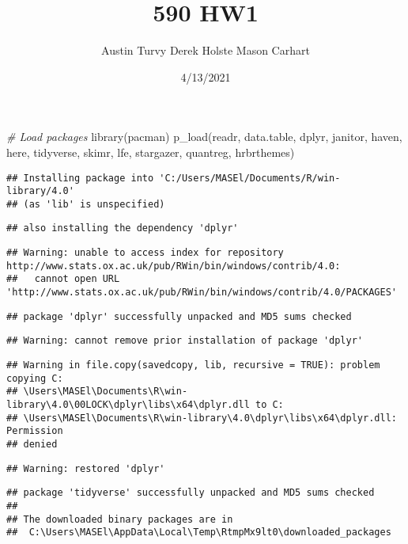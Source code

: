 \documentclass[
]{article}
\title{590 HW1}
\author{Austin Turvy Derek Holste Mason Carhart}
\date{4/13/2021}
\newenvironment{Shaded}{\begin{snugshade}}{\end{snugshade}}
\newcommand{\CommentTok}[1]{\textcolor[rgb]{0.56,0.35,0.01}{\textit{#1}}}
\newcommand{\FunctionTok}[1]{\textcolor[rgb]{0.00,0.00,0.00}{#1}}
\newcommand{\NormalTok}[1]{#1}
\begin{document}
\maketitle

\begin{Shaded}
\begin{Highlighting}[]
\CommentTok{\# Load packages}
\FunctionTok{library}\NormalTok{(pacman)}
\FunctionTok{p\_load}\NormalTok{(readr, data.table, dplyr, janitor, haven, here, }
\NormalTok{       tidyverse, skimr, lfe, stargazer, quantreg, hrbrthemes)}
\end{Highlighting}
\end{Shaded}

\begin{verbatim}
## Installing package into 'C:/Users/MASEl/Documents/R/win-library/4.0'
## (as 'lib' is unspecified)
\end{verbatim}

\begin{verbatim}
## also installing the dependency 'dplyr'
\end{verbatim}

\begin{verbatim}
## Warning: unable to access index for repository http://www.stats.ox.ac.uk/pub/RWin/bin/windows/contrib/4.0:
##   cannot open URL 'http://www.stats.ox.ac.uk/pub/RWin/bin/windows/contrib/4.0/PACKAGES'
\end{verbatim}

\begin{verbatim}
## package 'dplyr' successfully unpacked and MD5 sums checked
\end{verbatim}

\begin{verbatim}
## Warning: cannot remove prior installation of package 'dplyr'
\end{verbatim}

\begin{verbatim}
## Warning in file.copy(savedcopy, lib, recursive = TRUE): problem copying C:
## \Users\MASEl\Documents\R\win-library\4.0\00LOCK\dplyr\libs\x64\dplyr.dll to C:
## \Users\MASEl\Documents\R\win-library\4.0\dplyr\libs\x64\dplyr.dll: Permission
## denied
\end{verbatim}

\begin{verbatim}
## Warning: restored 'dplyr'
\end{verbatim}

\begin{verbatim}
## package 'tidyverse' successfully unpacked and MD5 sums checked
## 
## The downloaded binary packages are in
##  C:\Users\MASEl\AppData\Local\Temp\RtmpMx9lt0\downloaded_packages
\end{verbatim}
\end{document}
